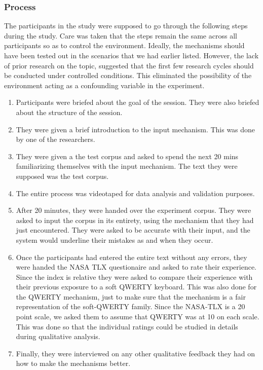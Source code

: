 \subsubsection{Process}
The participants in the study were supposed to go through the following steps during the study. Care was taken that the steps remain the same across all participants so as to control the environment. Ideally, the mechanisms should have been tested out in the scenarios that we had earlier listed. However, the lack of prior research on the topic, suggested that the first few research cycles should be conducted under controlled conditions. This eliminated the possibility of the environment acting as a confounding variable in the experiment.
\begin{enumerate}
	\item Participants were briefed about the goal of the session. They were also briefed about the structure of the session.
	\item They were given a brief introduction to the input mechanism. This was done by one of the researchers.
	\item They were given a the test corpus and asked to spend the next 20 mins familiarizing themselves with the input mechanism. The text they were supposed was the test corpus.
	\item The entire process was videotaped for data analysis and validation purposes.
	\item After 20 minutes, they were handed over the experiment corpus. They were asked to input the corpus in its entirety, using the mechanism that they had just encountered. They were asked to be accurate with their input, and the system would underline their mistakes as and when they occur.
	\item Once the participants had entered the entire text without any errors, they were handed the NASA TLX questionaire and asked to rate their experience. Since the index is relative they were asked to compare their experience with their previous exposure to a soft QWERTY keyboard. This was also done for the QWERTY mechanism, just to make sure that the mechanism is a fair representation of the soft-QWERTY family. Since the NASA-TLX is a 20 point scale, we asked them to assume that QWERTY was at 10 on each scale. This was done so that the individual ratings could be studied in details during qualitative analysis.
	\item Finally, they were interviewed on any other qualitative feedback they had on how to make the mechanisms better.
\end{enumerate}
	